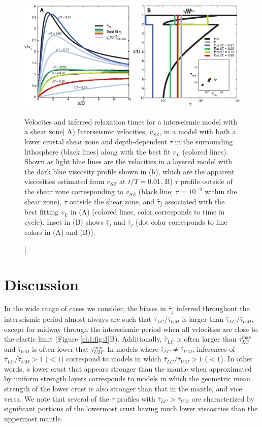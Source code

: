 \begin{figure}
\includegraphics{ch1/figures/Figure4.eps}
\caption
[Velocites and inferred relaxation times for a interseismic model with
a shear zone]
{A) Interseismic velocities, $v_{SZ}$, in a model with both a lower
crustal shear zone and depth-dependent $\tau$ in the surrounding
lithosphere (black lines) along with the best fit $v_{L}$ (colored
lines).  Shown as light blue lines are the velocities in a layered
model with the dark blue viscosity profile shown in (b), which are the
apparent viscosities estimated from $v_{SZ}$ at $t/T = 0.01$.  B)
$\tau$ profile outside of the shear zone corresponding to $v_{SZ}$
(black line; $\tau$ = $10^{-2}$ within the shear zone), $\bar{\tau}$
outside the shear zone, and $\hat{\tau}_j$ associated with the best
fitting $v_{L}$ in (A) (colored lines, color corresponds to time in
cycle). Inset in (B) shows $\bar{\tau}_j$ and $\hat{\tau}_j$ (dot
color corresponds to line colors in (A) and (B)).}
\label{ch1:fig:4}
\end{figure}

\section{Discussion}
In the wide range of cases we consider, the biases in $\hat{\tau}_j$
inferred throughout the interseismic period almost always are such
that $\hat{\tau}_{LC}/\hat{\tau}_{UM}$ is larger than
$\bar{\tau}_{LC}/\bar{\tau}_{UM}$, except for midway through the
interseismic period when all velocities are close to the elastic limit
(Figure \ref{ch1:fig:3}B).  Additionally, $\hat{\tau}_{LC}$ is often
larger than $\tau^{\max}_{LC}$ and $\hat{\tau}_{UM}$ is often lower
that $\tau^{\min}_{UM}$.  In models where $\bar{\tau}_{LC} \ne
\bar{\tau}_{UM}$, inferences of $\hat{\tau}_{LC}/\hat{\tau}_{UM}>1$
($<1$) correspond to models in which
$\bar{\tau}_{LC}/\bar{\tau}_{UM}>1$ ($<1$). In other words, a lower
crust that appears stronger than the mantle when approximated by
uniform strength layers corresponds to models in which the geometric
mean strength of the lower crust is also stronger than that in the
mantle, and vice versa.  We note that several of the $\tau$ profiles
with $\bar{\tau}_{LC} > \bar{\tau}_{UM}$ are characterized by
significant portions of the lowermost crust having much lower
viscosities than the uppermost mantle.

